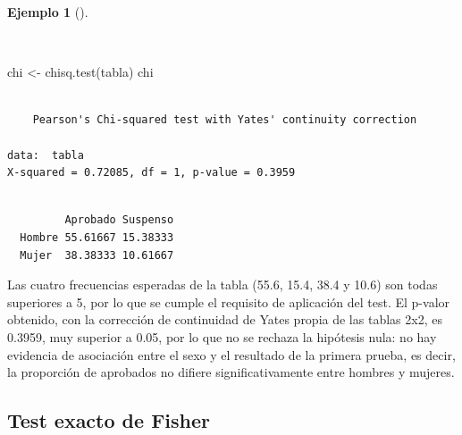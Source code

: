 \documentclass[
  spanish,
  a4paper,
]{scrreport}
\newenvironment{Shaded}{\begin{snugshade}}{\end{snugshade}}
\newcommand{\FunctionTok}[1]{\textcolor[rgb]{0.28,0.35,0.67}{#1}}
\newcommand{\NormalTok}[1]{\textcolor[rgb]{0.00,0.23,0.31}{#1}}
\newcommand{\OtherTok}[1]{\textcolor[rgb]{0.00,0.23,0.31}{#1}}
\newcommand{\SpecialCharTok}[1]{\textcolor[rgb]{0.37,0.37,0.37}{#1}}
\theoremstyle{definition}
\newtheorem{example}{Ejemplo}[chapter]
\theoremstyle{definition}
\theoremstyle{remark}
\begin{document}
\begin{example}[]\protect\hypertarget{exm-dosindep-test-chi-cuadrado}{}\label{exm-dosindep-test-chi-cuadrado}

~

\begin{Shaded}
\begin{Highlighting}[]
\NormalTok{chi }\OtherTok{\textless{}{-}} \FunctionTok{chisq.test}\NormalTok{(tabla)}
\NormalTok{chi}
\end{Highlighting}
\end{Shaded}

\begin{verbatim}

    Pearson's Chi-squared test with Yates' continuity correction

data:  tabla
X-squared = 0.72085, df = 1, p-value = 0.3959
\end{verbatim}

\begin{Shaded}
\end{Shaded}

\begin{verbatim}
        
         Aprobado Suspenso
  Hombre 55.61667 15.38333
  Mujer  38.38333 10.61667
\end{verbatim}

Las cuatro frecuencias esperadas de la tabla (55.6, 15.4, 38.4 y 10.6)
son todas superiores a 5, por lo que se cumple el requisito de
aplicación del test. El p-valor obtenido, con la corrección de
continuidad de Yates propia de las tablas 2x2, es 0.3959, muy superior a
0.05, por lo que no se rechaza la hipótesis nula: no hay evidencia de
asociación entre el sexo y el resultado de la primera prueba, es decir,
la proporción de aprobados no difiere significativamente entre hombres y
mujeres.

\end{example}

\subsection{Test exacto de Fisher}\label{test-exacto-de-fisher}
\end{document}
